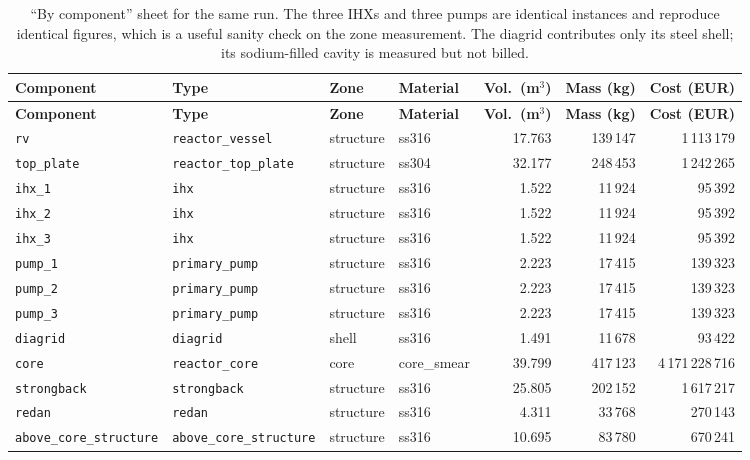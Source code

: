 \documentclass[9pt,a4paper]{extarticle}
\newcommand{\code}[1]{\texttt{\small #1}}
\begin{document}
\begin{footnotesize}
\begin{longtable}{@{}llllrrr@{}}
\caption{``By component'' sheet for the same run. The three IHXs and three pumps
are identical instances and reproduce identical figures, which is a useful
sanity check on the zone measurement. The diagrid contributes only its steel
shell; its sodium-filled cavity is measured but not billed.}
\label{tab:bycomponent}\\
\toprule
\textbf{Component} & \textbf{Type} & \textbf{Zone} & \textbf{Material} &
\textbf{Vol.\ (m$^3$)} & \textbf{Mass (kg)} & \textbf{Cost (EUR)} \\
\midrule
\endfirsthead
\toprule
\textbf{Component} & \textbf{Type} & \textbf{Zone} & \textbf{Material} &
\textbf{Vol.\ (m$^3$)} & \textbf{Mass (kg)} & \textbf{Cost (EUR)} \\
\midrule
\endhead
\code{rv}         & \code{reactor\_vessel}    & structure & ss316       & 17.763 & 139\,147 & 1\,113\,179 \\
\code{top\_plate} & \code{reactor\_top\_plate}& structure & ss304       & 32.177 & 248\,453 & 1\,242\,265 \\
\code{ihx\_1}     & \code{ihx}                & structure & ss316       &  1.522 &  11\,924 &    95\,392 \\
\code{ihx\_2}     & \code{ihx}                & structure & ss316       &  1.522 &  11\,924 &    95\,392 \\
\code{ihx\_3}     & \code{ihx}                & structure & ss316       &  1.522 &  11\,924 &    95\,392 \\
\code{pump\_1}    & \code{primary\_pump}      & structure & ss316       &  2.223 &  17\,415 &   139\,323 \\
\code{pump\_2}    & \code{primary\_pump}      & structure & ss316       &  2.223 &  17\,415 &   139\,323 \\
\code{pump\_3}    & \code{primary\_pump}      & structure & ss316       &  2.223 &  17\,415 &   139\,323 \\
\code{diagrid}    & \code{diagrid}            & shell     & ss316       &  1.491 &  11\,678 &    93\,422 \\
\code{core}       & \code{reactor\_core}      & core      & core\_smear & 39.799 & 417\,123 & 4\,171\,228\,716 \\
\code{strongback} & \code{strongback}         & structure & ss316       & 25.805 & 202\,152 & 1\,617\,217 \\
\code{redan}      & \code{redan}              & structure & ss316       &  4.311 &  33\,768 &   270\,143 \\
\code{above\_core\_structure} & \code{above\_core\_structure} & structure & ss316 & 10.695 & 83\,780 & 670\,241 \\
\bottomrule
\end{longtable}
\end{footnotesize}
\end{document}
